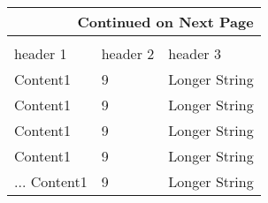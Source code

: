     \begin{texcode}
        \begin{center}
            \begin{longtable}{|l|l|>{\centering\arraybackslash}p{}|}%
                    \hline%
                    \multicolumn{3}{r}{Continued on Next Page}\\%
                    \hline%
                \endfoot%
                    \hline%
                    \multicolumn{3}{r}{Not Continued on Next Page}\\%
                    \hline%
                \endlastfoot%
                \hline
                header 1&header 2&header 3\\%
                \hline
                Content1&9&Longer String\\%
                Content1&9&Longer String\\%
                Content1&9&Longer String\\%
                Content1&9&Longer String\\%
                ...
                Content1&9&Longer String\\%
            \end{longtable}%
        \end{center}
    \end{texcode}
